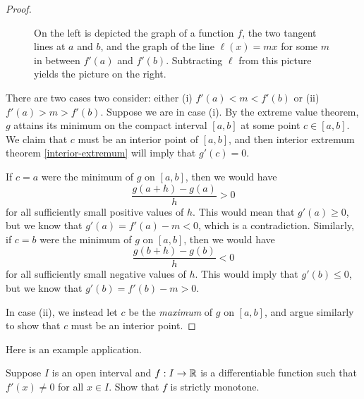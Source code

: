 \begin{proof}
\begin{figure}
\begin{center}
		\end{center}
		\caption{On the left is depicted the graph of a function $f$, the two tangent lines at $a$ and $b$, and the graph of the line $\ell(x) = mx$ for some $m$ in between $f'(a)$ and $f'(b)$. Subtracting $\ell$ from this picture yields the picture on the right.}  \label{subtracting-a-line}
	\end{figure}
	
	There are two cases two consider: either (i) $f'(a) < m < f'(b)$ or (ii) $f'(a) > m > f'(b)$. Suppose we are in case (i). By the extreme value theorem, $g$ attains its minimum on the compact interval $[a,b]$ at some point $c \in [a,b]$. We claim that $c$ must be an interior point of $[a,b]$, and then interior extremum theorem \ref{interior-extremum} will imply that $g'(c) = 0$. 
	
	If $c = a$ were the minimum of $g$ on $[a,b]$, then we would have 
	\[ \frac{g(a+h)-g(a)}{h} > 0 \]
	for all sufficiently small positive values of $h$. This would mean that $g'(a) \geq 0$, but we know that $g'(a) = f'(a) - m < 0$, which is a contradiction. Similarly, if $c = b$ were the minimum of $g$ on $[a,b]$, then we would have
	\[ \frac{g(b+h)-g(b)}{h} < 0 \]
	for all sufficiently small negative values of $h$. This would imply that $g'(b) \leq 0$, but we know that $g'(b) = f'(b) - m > 0$. 
	
	In case (ii), we instead let $c$ be the \emph{maximum} of $g$ on $[a,b]$, and argue similarly to show that $c$ must be an interior point. 
\end{proof}

Here is an example application. 

\begin{exercise} \label{nonzero-derivative-implies-strictly-monotone}
	Suppose $I$ is an open interval and $f : I \to \mathbb{R}$ is a differentiable function such that $f'(x) \neq 0$ for all $x \in I$. Show that $f$ is strictly monotone. 
\end{exercise}


